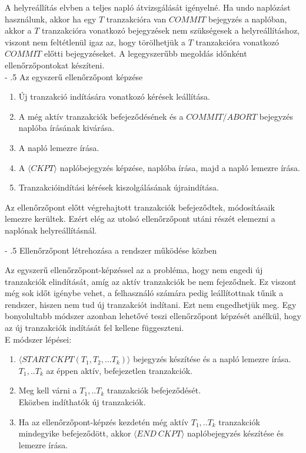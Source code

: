 \documentclass[12pt,margin=0px]{article}
\makeatletter
\renewcommand\paragraph{%
	\@startsection{paragraph}{4}{0mm}%
	{-\baselineskip}%
	{.5\baselineskip}%
	{\normalfont\normalsize\bfseries}}
\makeatother
\begin{document}
	A helyreállítás elvben a teljes napló átvizsgálását igényelné. Ha undo naplózást használunk, akkor ha egy $T$ tranzakcióra
	van $COMMIT$ bejegyzés a naplóban, akkor a $T$ tranzakcióra vonatkozó bejegyzések nem szükségesek a helyreállításhoz, viszont
	nem feltétlenül igaz az, hogy törölhetjük a $T$ tranzakcióra vonatkozó $COMMIT$ előtti bejegyzéseket. A legegyszerűbb megoldás
	időnként ellenőrzőpontokat készíteni.\\
	
	\paragraph{Az egyszerű ellenőrzőpont képzése}
	\begin{enumerate}
		\item	Új tranzakció indítására vonatkozó kérések leállítása.
		\item	A még aktív tranzakciók befejeződésének és a $COMMIT/ABORT$ bejegyzés naplóba írásának kivárása.
		\item	A napló lemezre írása.
		\item	A $\langle CKPT \rangle$ naplóbejegyzés képzése, naplóba írása, majd a napló lemezre írása.
		\item	Tranzakcióindítási kérések kiszolgálásának újraindítása.
	\end{enumerate}
	
    \noindent Az ellenőrzőpont előtt végrehajtott tranzakciók befejeződtek, módosításaik lemezre kerültek. Ezért elég az utolsó ellenőrzőpont utáni	részét elemezni a naplónak helyreállításnál.
	
	\paragraph{Ellenőrzőpont létrehozása a rendszer működése közben}

	Az egyszerű ellenőrzőpont-képzéssel az a probléma, hogy nem engedi új tranzakciók elindítását, amíg az aktív tranzakciók be nem fejeződnek. Ez viszont még sok időt igénybe vehet, a felhasználó számára pedig leállítottnak tűnik a rendszer, hiszen nem
	tud új tranzakciót indítani. Ezt nem engedhetjük meg. Egy bonyolultabb módszer azonban lehetővé teszi ellenőrzőpont képzését anélkül, hogy az új tranzakciók indítását fel kellene függeszteni.\\
	
	\noindent E módszer lépései:
	\begin{enumerate}
		\item	$\langle START \ CKPT(T_{1},T_{2},...T_{k}) \rangle$ bejegyzés készítése és a napló lemezre írása.\\
        $T_{1},..T_{k}$	az éppen aktív, befejezetlen tranzakciók.
		\item	Meg kell várni a $T_{1},..T_{k}$ tranzakciók befejeződését.\\
        Eközben indíthatók új tranzakciók.
		\item	Ha az ellenőrzőpont-képzés kezdetén még aktív $T_{1},..T_{k}$ tranzakciók mindegyike befejeződött, akkor
		$\langle END \ CKPT \rangle$ naplóbejegyzés készítése és lemezre írása.
	\end{enumerate}
	
\end{document}
